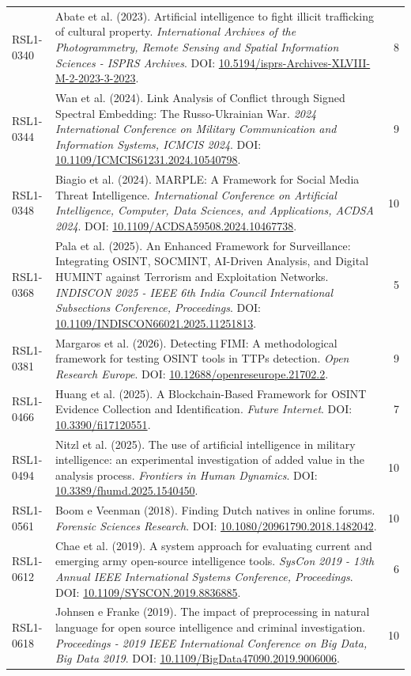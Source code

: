 \begin{small}
\begin{longtable}{lp{11.2cm}r}
RSL1-0340 & Abate et al. (2023). Artificial intelligence to fight illicit trafficking of cultural property. \textit{International Archives of the Photogrammetry, Remote Sensing and Spatial Information Sciences - ISPRS Archives}. DOI: \url{10.5194/isprs-Archives-XLVIII-M-2-2023-3-2023}. & 8 \\
RSL1-0344 & Wan et al. (2024). Link Analysis of Conflict through Signed Spectral Embedding: The Russo-Ukrainian War. \textit{2024 International Conference on Military Communication and Information Systems, ICMCIS 2024}. DOI: \url{10.1109/ICMCIS61231.2024.10540798}. & 9 \\
RSL1-0348 & Biagio et al. (2024). MARPLE: A Framework for Social Media Threat Intelligence. \textit{International Conference on Artificial Intelligence, Computer, Data Sciences, and Applications, ACDSA 2024}. DOI: \url{10.1109/ACDSA59508.2024.10467738}. & 10 \\
RSL1-0368 & Pala et al. (2025). An Enhanced Framework for Surveillance: Integrating OSINT, SOCMINT, AI-Driven Analysis, and Digital HUMINT against Terrorism and Exploitation Networks. \textit{INDISCON 2025 - IEEE 6th India Council International Subsections Conference, Proceedings}. DOI: \url{10.1109/INDISCON66021.2025.11251813}. & 5 \\
RSL1-0381 & Margaros et al. (2026). Detecting FIMI: A methodological framework for testing OSINT tools in TTPs detection. \textit{Open Research Europe}. DOI: \url{10.12688/openreseurope.21702.2}. & 9 \\
RSL1-0466 & Huang et al. (2025). A Blockchain-Based Framework for OSINT Evidence Collection and Identification. \textit{Future Internet}. DOI: \url{10.3390/fi17120551}. & 7 \\
RSL1-0494 & Nitzl et al. (2025). The use of artificial intelligence in military intelligence: an experimental investigation of added value in the analysis process. \textit{Frontiers in Human Dynamics}. DOI: \url{10.3389/fhumd.2025.1540450}. & 10 \\
RSL1-0561 & Boom e Veenman (2018). Finding Dutch natives in online forums. \textit{Forensic Sciences Research}. DOI: \url{10.1080/20961790.2018.1482042}. & 10 \\
RSL1-0612 & Chae et al. (2019). A system approach for evaluating current and emerging army open-source intelligence tools. \textit{SysCon 2019 - 13th Annual IEEE International Systems Conference, Proceedings}. DOI: \url{10.1109/SYSCON.2019.8836885}. & 6 \\
RSL1-0618 & Johnsen e Franke (2019). The impact of preprocessing in natural language for open source intelligence and criminal investigation. \textit{Proceedings - 2019 IEEE International Conference on Big Data, Big Data 2019}. DOI: \url{10.1109/BigData47090.2019.9006006}. & 10 \\

\end{longtable}
\end{small}

